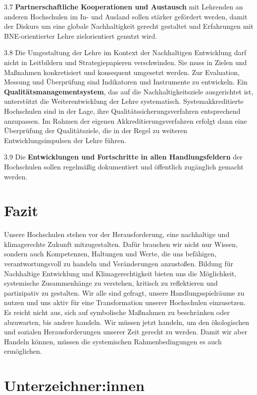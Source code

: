 \documentclass[DIV=12]{scrartcl}
\begin{document}
3.7 \textbf{Partnerschaftliche Kooperationen und Austausch} mit
Lehrenden an anderen Hochschulen im In- und Ausland sollen stärker
gefördert werden, damit der Diskurs um eine globale Nachhaltigkeit
gerecht gestaltet und Erfahrungen mit BNE-orientierter Lehre
zielorientiert genutzt wird.

3.8 Die Umgestaltung der Lehre im Kontext der Nachhaltigen Entwicklung
darf nicht in Leitbildern und Strategiepapieren verschwinden. Sie muss
in Zielen und Maßnahmen konkretisiert und konsequent umgesetzt werden.
Zur Evaluation, Messung und Überprüfung sind Indikatoren und Instrumente
zu entwickeln. Ein \textbf{Qualitätsmanagementsystem}, das auf die
Nachhaltigkeitsziele ausgerichtet ist, unterstützt die Weiterentwicklung
der Lehre systematisch. Systemakkreditierte Hochschulen sind in der
Lage, ihre Qualitätssicherungsverfahren entsprechend anzupassen. Im
Rahmen der eigenen Akkreditierungsverfahren erfolgt dann eine
Überprüfung der Qualitätsziele, die in der Regel zu weiteren
Entwicklungsimpulsen der Lehre führen.

3.9 Die \textbf{Entwicklungen und Fortschritte in allen
Handlungsfeldern} der Hochschulen sollen regelmäßig dokumentiert und
öffentlich zugänglich gemacht werden.

\hypertarget{fazit}{%
\section{Fazit}\label{fazit}}

Unsere Hochschulen stehen vor der Herausforderung, eine nachhaltige und
klimagerechte Zukunft mitzugestalten. Dafür brauchen wir nicht nur
Wissen, sondern auch Kompetenzen, Haltungen und Werte, die uns
befähigen, verantwortungsvoll zu handeln und Veränderungen anzustoßen.
Bildung für Nachhaltige Entwicklung und Klimagerechtigkeit bieten uns
die Möglichkeit, systemische Zusammenhänge zu verstehen, kritisch zu
reflektieren und partizipativ zu gestalten. Wir alle sind gefragt,
unsere Handlungsspielräume zu nutzen und uns aktiv für eine
Transformation unserer Hochschulen einzusetzen. Es reicht nicht aus,
sich auf symbolische Maßnahmen zu beschränken oder abzuwarten, bis
andere handeln. Wir müssen jetzt handeln, um den ökologischen und
sozialen Herausforderungen unserer Zeit gerecht zu werden. Damit wir
aber Handeln können, müssen die systemischen Rahmenbedingungen es auch
ermöglichen.

\hypertarget{unterzeichnerinnen}{
\section*{Unterzeichner:innen}\label{unterzeichnerinnen}}
\end{document}
